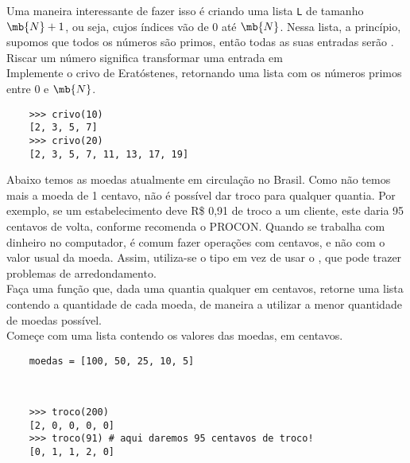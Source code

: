         Uma maneira interessante de fazer isso é criando uma lista \texttt{L} de tamanho $\mb{N} + 1$, ou seja, cujos índices vão de 0 até $\mb{N}$. Nessa lista, a princípio, supomos que todos os números são primos, então todas as suas entradas serão . Riscar um número significa transformar uma entrada em \\
        
        \quest Implemente o crivo de Eratóstenes, retornando uma lista com os números primos entre 0 e $\mb{N}$.\\
        
        \example
        \begin{lstlisting}
    >>> crivo(10)
    [2, 3, 5, 7]
    >>> crivo(20)
    [2, 3, 5, 7, 11, 13, 17, 19]
        \end{lstlisting}
        
        \pagebreak
        
        
        Abaixo temos as moedas atualmente em circulação no Brasil. Como não temos mais a moeda de 1 centavo, não é possível dar troco para qualquer quantia. Por exemplo, se um estabelecimento deve R\$ 0,91 de troco a um cliente, este daria 95 centavos de volta, conforme recomenda o PROCON.
        Quando se trabalha com dinheiro no computador, é comum fazer operações com centavos, e não com o valor usual da moeda. Assim, utiliza-se o tipo  em vez de usar o , que pode trazer problemas de arredondamento.\\
        
        \quest Faça uma função que, dada uma quantia qualquer em centavos, retorne uma lista contendo a quantidade de cada moeda, de maneira a utilizar a menor quantidade de moedas possível.\\
        
        \clue Começe com uma lista contendo os valores das moedas, em centavos.\\
        
        \begin{lstlisting}
    moedas = [100, 50, 25, 10, 5]
        \end{lstlisting}	
        ~\\
        \example
        \begin{lstlisting}
    >>> troco(200)
    [2, 0, 0, 0, 0]
    >>> troco(91) # aqui daremos 95 centavos de troco!
    [0, 1, 1, 2, 0]
        \end{lstlisting}
        \pagebreak
        
